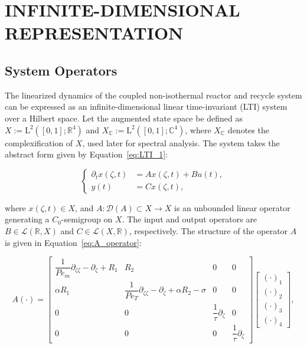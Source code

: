 \section{INFINITE-DIMENSIONAL REPRESENTATION} \label{sec:3_LTI}

\subsection{System Operators}

The linearized dynamics of the coupled non-isothermal reactor and recycle system can be expressed as an infinite-dimensional linear time-invariant (LTI) system over a Hilbert space. Let the augmented state space be defined as $X := \mathrm{L}^2([0,1]; \mathbb{R}^4)$ and $X_\mathbb{C} := \mathrm{L}^2([0,1]; \mathbb{C}^4)$, where $X_\mathbb{C}$ denotes the complexification of $X$, used later for spectral analysis. The system takes the abstract form given by Equation~\eqref{eq:LTI_1}:

\begin{equation} \label{eq:LTI_1}
\begin{cases}
\partial_t x(\zeta, t) &= A x(\zeta, t) + B u(t), \\
y(t) &= C x(\zeta, t),
\end{cases}
\end{equation}

where $x(\zeta, t) \in X$, and $A : \mathcal{D}(A) \subset X \to X$ is an unbounded linear operator generating a $C_0$-semigroup on $X$. The input and output operators are $B \in \mathcal{L}(\mathbb{R}, X)$ and $C \in \mathcal{L}(X, \mathbb{R})$, respectively. The structure of the operator $A$ is given in Equation~\eqref{eq:A_operator}:

\begin{equation} \label{eq:A_operator}
A (\cdot) =
\begin{bmatrix} 
\dfrac{1}{Pe_m} \partial_{\zeta\zeta} - \partial_\zeta + R_1 & R_2 & 0 & 0 \\
\alpha R_1 & \dfrac{1}{Pe_T} \partial_{\zeta\zeta} - \partial_\zeta + \alpha R_2 - \sigma & 0 & 0 \\
0 & 0 & \dfrac{1}{\tau} \partial_\zeta & 0 \\
0 & 0 & 0 & \dfrac{1}{\tau} \partial_\zeta
\end{bmatrix} \begin{bmatrix} (\cdot)_1 \\ (\cdot)_2 \\ (\cdot)_3 \\ (\cdot)_4 \end{bmatrix},
\end{equation}

